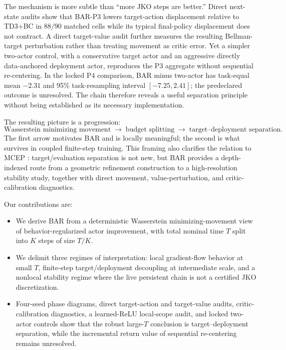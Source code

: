 \documentclass[twoside]{article}
\begin{document}
The mechanism is more subtle than ``more JKO steps are better.'' Direct next-state audits show that BAR-P3 lowers target-action displacement relative to TD3+BC in $88/90$ matched cells while its typical final-policy displacement does not contract. A direct target-value audit further measures the resulting Bellman-target perturbation rather than treating movement as critic error. Yet a simpler two-actor control, with a conservative target actor and an aggressive directly data-anchored deployment actor, reproduces the P3 aggregate without sequential re-centering. In the locked P4 comparison, BAR minus two-actor has task-equal mean $-2.31$ and 95\% task-resampling interval $[-7.25,2.41]$; the predeclared outcome is unresolved. The chain therefore reveals a useful separation principle without being established as its necessary implementation.

The resulting picture is a progression:
\[
\text{Wasserstein minimizing movement}
\;\longrightarrow\;
\text{budget splitting}
\;\longrightarrow\;
\text{target--deployment separation}.
\]
The first arrow motivates BAR and is locally meaningful; the second is what survives in coupled finite-step training. This framing also clarifies the relation to MCEP \citep{xu2024mcep}: target/evaluation separation is not new, but BAR provides a depth-indexed route from a geometric refinement construction to a high-resolution stability study, together with direct movement, value-perturbation, and critic-calibration diagnostics.

Our contributions are:
\begin{itemize}
\item We derive BAR from a deterministic Wasserstein minimizing-movement view of behavior-regularized actor improvement, with total nominal time $T$ split into $K$ steps of size $T/K$.
\item We delimit three regimes of interpretation: local gradient-flow behavior at small $T$, finite-step target/deployment decoupling at intermediate scale, and a nonlocal stability regime where the live persistent chain is not a certified JKO discretization.
\item Four-seed phase diagrams, direct target-action and target-value audits, critic-calibration diagnostics, a learned-ReLU local-scope audit, and locked two-actor controls show that the robust large-$T$ conclusion is target--deployment separation, while the incremental return value of sequential re-centering remains unresolved.
\end{itemize}
\end{document}
